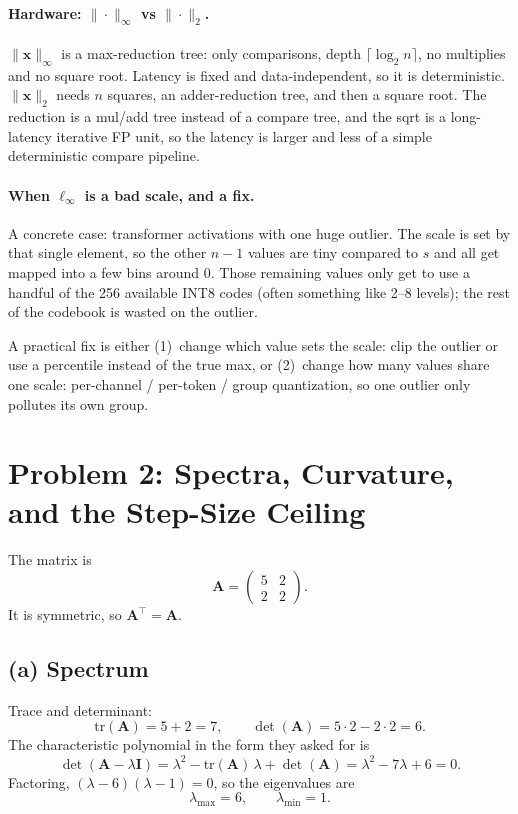 \documentclass[11pt]{article}
\newcommand{\vct}[1]{\mathbf{#1}}
\newcommand{\mat}[1]{\mathbf{#1}}
\begin{document}
\paragraph{Hardware: \(\|\cdot\|_\infty\) vs \(\|\cdot\|_2\).}
\(\|\vct{x}\|_\infty\) is a max-reduction tree: only comparisons, depth
\(\lceil \log_2 n \rceil\), no multiplies and no square root. Latency is
fixed and data-independent, so it is deterministic.
\(\|\vct{x}\|_2\) needs \(n\) squares, an adder-reduction tree, and then a
square root. The reduction is a mul/add tree instead of a compare tree, and
the sqrt is a long-latency iterative FP unit, so the latency is larger and
less of a simple deterministic compare pipeline.

\paragraph{When \(\ell_\infty\) is a bad scale, and a fix.}
A concrete case: transformer activations with one huge outlier. The scale is
set by that single element, so the other \(n-1\) values are tiny compared to
\(s\) and all get mapped into a few bins around 0. Those remaining values
only get to use a handful of the 256 available INT8 codes (often something
like 2--8 levels); the rest of the codebook is wasted on the outlier.

A practical fix is either (1)~change which value sets the scale: clip the
outlier or use a percentile instead of the true max, or (2)~change how many
values share one scale: per-channel / per-token / group quantization, so one
outlier only pollutes its own group.

\newpage
\section{Problem 2: Spectra, Curvature, and the Step-Size Ceiling}

The matrix is
\[
\mat{A}
=
\begin{pmatrix}
5 & 2 \\
2 & 2
\end{pmatrix}.
\]
It is symmetric, so \(\mat{A}^\top = \mat{A}\).

\subsection*{(a) Spectrum}

Trace and determinant:
\[
\mathrm{tr}(\mat{A}) = 5+2 = 7,
\qquad
\det(\mat{A}) = 5\cdot 2 - 2\cdot 2 = 6.
\]
The characteristic polynomial in the form they asked for is
\[
\det(\mat{A} - \lambda \mat{I})
= \lambda^2 - \mathrm{tr}(\mat{A})\,\lambda + \det(\mat{A})
= \lambda^2 - 7\lambda + 6
= 0.
\]
Factoring, \((\lambda-6)(\lambda-1)=0\), so the eigenvalues are
\[
\lambda_{\max} = 6, \qquad \lambda_{\min} = 1.
\]
\end{document}
